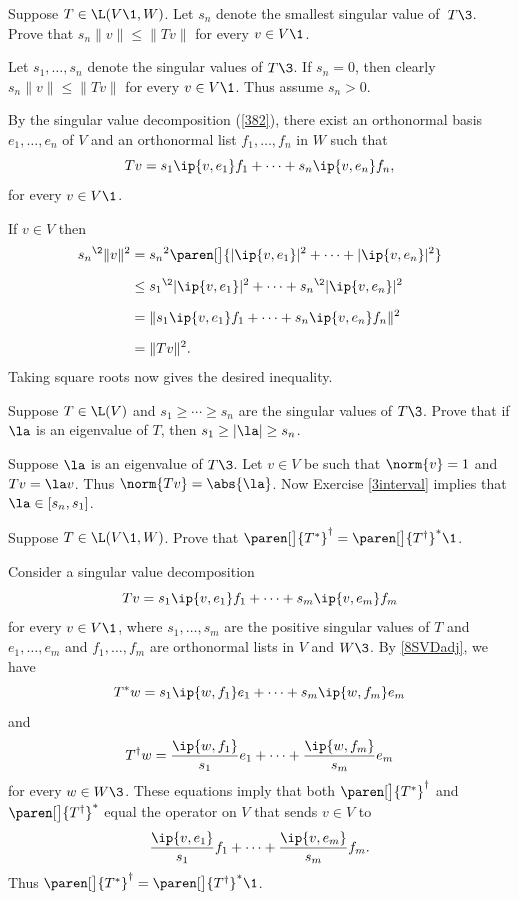 \exercise
Suppose $T \in \L(V\1,W)$.  Let $s_n$ denote the smallest singular value of~$T\3$.
Prove that $s_n \| v \| \le \| Tv \|$ for every $v \in V\1$. \label{3smallSV}

\begin{Solution}
Let $s_1, \ldots, s_n$ denote the singular values of $T\3$. If $s_n = 0$, then clearly $s_n \| v \| \le \| Tv \|$
for every $v \in V\1$. Thus assume $s_n > 0$.

By the singular value decomposition (\ref{382}), there exist
an orthonormal basis $e_1, \dots, e_n$ of $V$ and an orthonormal list $f_1, \dots, f_n$ in $W$ such that
\[
Tv = s_1 \ip{v, e_1} f_1 + \dots + s_n \ip{v, e_n} f_n,
\]
for every $v \in V\1$.

If $v \in V$ then
\begin{align*}
{s_n}^{\2} \| v \|^2
&= {s_n}^2 \paren[\big]{|\ip{v, e_1}|^2 + \dots + |\ip{v, e_n}|^2} \\[6bp]
&\le {s_1}^{\2} |\ip{v, e_1}|^2 + \dots + {s_n}^{\2} |\ip{v, e_n}|^2 \\[6bp]
&= \|s_1 \ip{v, e_1} f_1 + \dots + s_n \ip{v, e_n} f_n \|^2 \\[6bp]
&= \|Tv\|^2.
\end{align*}
Taking square roots now gives the desired inequality.
\end{Solution}

\exercise
Suppose $T \in \L(V)$ and $s_1 \ge \cdots \ge s_n$ are the singular values of $T\3$.
Prove that if $\la$ is an eigenvalue of $T$, then $s_1  \ge |\la| \ge s_n$.

\begin{Solution}
Suppose $\la$ is an eigenvalue of $T\3$. Let $v \in V$ be such that $\norm{v} = 1$ and $Tv = \la v$. Thus $\norm{Tv} = \abs{\la}$. Now Exercise \ref{3interval} implies that $\la \in [s_n, s_1]$.
\end{Solution}

\exercise
Suppose $T \in \L(V\1, W)$. Prove that $\paren[\big]{T^*}^\dagger = \paren[\big]{T^\dagger}^*\1$.\label{7Tdagstar}

\begin{Solution}
Consider a singular value decomposition
\[
Tv = s_1 \ip{v, e_1} f_1 + \dots + s_m \ip{v, e_m} f_m
\]
for every $v \in V\1$, where $s_1, \dots, s_m$ are the positive singular values of $T$ and $e_1, \dots, e_m$ and $f_1, \dots, f_m$ are orthonormal lists in $V$ and $W\3$. By \ref{8SVDadj}, we have
\[
T^*w = s_1 \ip{w, f_1} e_1 + \dots + s_m \ip{w, f_m} e_m
\]
and
\[
T^\dagger w = \frac{\ip{w, f_1}}{s_1} e_1 + \dots + \frac{\ip{w, f_m}}{s_m} e_m
\]
for every $w \in W\3$. These equations imply that both $\paren[\big]{T^*}^\dagger$ and $\paren[\big]{T^\dagger}^*$ equal the operator on $V$ that sends $v \in V$ to
\[
\frac{\ip{v, e_1}}{s_1} f_1 + \cdots + \frac{\ip{v, e_m}}{s_m} f_m.
\]
Thus $\paren[\big]{T^*}^\dagger = \paren[\big]{T^\dagger}^*\1$.
\end{Solution}

